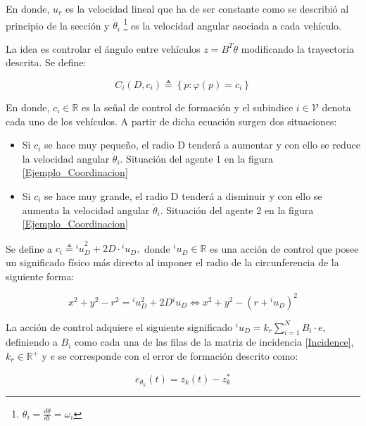 En donde, $u_{r}$ es la velocidad lineal que ha de ser constante como se describió al principio de la sección y $\dot{\theta}_{i}$ \footnote[7]{$\dot{\theta}_{i}=\frac{d\theta}{dt}=\omega_{i}$} es la velocidad angular asociada a cada vehículo.

La idea es controlar el ángulo entre vehículos $z = B^{T}\theta$ modificando la trayectoria descrita. Se define:

\begin{equation}\label{Control}
	C_i\left(D,c_{i}\right)\triangleq\left\lbrace{p:\varphi\left(p\right)=c_{i}}\right\rbrace
\end{equation}

En donde, $c_i \in \mathbb{R}$ es la señal de control de formación y el subindice $i\in\mathcal{V}$ denota cada uno de los vehículos. A partir de dicha ecuación surgen dos situaciones:

\begin{itemize}
	\item Si $c_i$ se hace muy pequeño, el radio D tenderá a aumentar y con ello se reduce la velocidad angular $\dot{\theta}_i$. Situación del agente 1 en la figura \ref{Ejemplo_Coordinacion}
	\item Si $c_i$ se hace muy grande, el radio D tenderá a disminuir y con ello se aumenta la velocidad angular $\dot{\theta}_i$. Situación del agente 2 en la figura \ref{Ejemplo_Coordinacion}
\end{itemize}

Se define a $c_i\triangleq{^{i}u}_{D}^{2}+2D\cdot{^i}u_{D},$ donde $^{i}u_{D}\in\mathbb{R}$ es una acción de control que posee un significado físico más directo al imponer el radio de la circunferencia de la siguiente forma:

\begin{equation}
	x^2+y^2-r^2={^{i}}u_{D}^{2}+2D{^{i}}u_{D} \Leftrightarrow x^2+y^2-(r+{^{i}}u_{D})^2
\end{equation}

La acción de control adquiere el siguiente significado ${^{i}}{u}_{D}=k_{r}\sum_{i=1}^N{B_i}\cdot{e}$, definiendo a $B_i$ como cada una de las filas de la matriz de incidencia \ref{Incidence}, $k_r\in\mathbb{R}^{+}$ y $e$ se corresponde con el error de formación descrito como: 

\begin{equation} \label{Error_Coordinacion}
	e_{\theta_{k}}\left(t\right)=z_{k}\left(t\right)-z_{k}^{*}
\end{equation}

